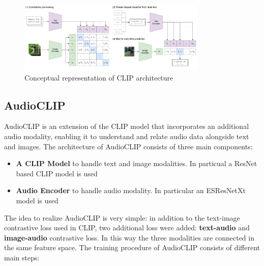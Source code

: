 \begin{figure}[H]
    \centering
    \includegraphics[width=0.8\textwidth, height=0.25\textheight]{img/CLIP.png}
    \caption{Conceptual representation of CLIP architecture}
\end{figure}

\subsection{AudioCLIP}
AudioCLIP \cite{AudioCLIP} is an extension of the CLIP model that incorporates an additional audio modality, enabling it to understand and relate audio data alongside text and images. The architecture of AudioCLIP consists of three main components:
\begin{itemize}
    \item \textbf{A CLIP Model} to handle text and image modalities. In particual a ResNet based CLIP model is used
    \item \textbf{Audio Encoder} to handle audio modality. In particular an ESResNetXt model is used
\end{itemize}
The idea to realize AudioCLIP is very simple: in addition to the text-image contrastive loss used in CLIP, two additional loss were added: \textbf{text-audio} and \textbf{image-audio} contrastive loss. In this way the three modalities are connected in the same feature space. The training procedure of AudioCLIP consists of different main steps:
